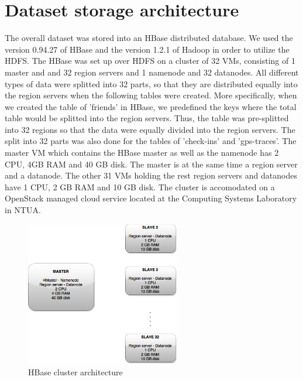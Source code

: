 \section{Dataset storage architecture}

The overall dataset was stored into an HBase distributed database. We used the version 0.94.27 of HBase and the version 1.2.1 of Hadoop in order to utilize 
the HDFS. 
The HBase was set up over HDFS on a cluster of 32 VMs, consisting of 1 master and and 32 region servers 
and 1 namenode and 32 datanodes. All different types of data were splitted into 32 parts, so that they are distributed equally into the region servers when the 
following tables were created. More specifically, when we created the table of 'friends' in HBase, we predefined the keys where the total table would be splitted 
into the region servers. Thus, the table was pre-splitted into 32 regions so that the data were equally divided into the region servers. The split into 32 parts was 
also done for the tables of 'check-ins' and 'gps-traces'. The master VM which contains the HBase master as well as the namenode has 2 CPU, 4GB RAM and 40 GB disk. 
The master is at the same time a region server and a datanode. The other 31 VMs holding the rest region servers and datanodes have 1 CPU, 2 GB RAM and 10 GB disk. 
The cluster is accomodated on a OpenStack managed cloud service located at the Computing Systems Laboratory in NTUA.

\begin{figure}[H]
  \centering
  \includegraphics[width=0.6\textwidth]{figures/hbase_cluster_gray.png}
  \caption{HBase cluster architecture}
\end{figure}

